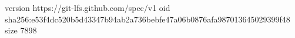 version https://git-lfs.github.com/spec/v1
oid sha256:e53f4dc520b5d43347b94ab2a736bebfe47a06b0876afa987013645029399f48
size 7898

